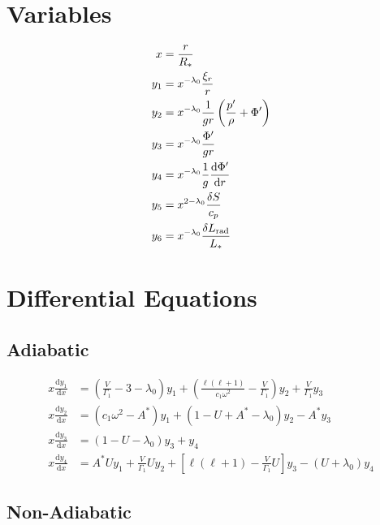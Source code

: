 \documentclass{article}
\newcommand{\diff}{\ensuremath{\mathrm{d}}}
\newcommand{\lz}{\ensuremath{\lambda_{0}}}
\newcommand{\Vg}{\ensuremath{\frac{V}{\Gamma_{1}}}}
\newcommand{\As}{\ensuremath{A^{\ast}}}
\newcommand{\Rstar}{\ensuremath{R_{\ast}}}
\newcommand{\Lrad}{\ensuremath{L_{\rm rad}}}
\newcommand{\Lstar}{\ensuremath{L_{\ast}}}
\begin{document}
\section*{Variables}

\begin{align*}
x     &= \frac{r}{\Rstar} \\
y_{1} &= x^{-\lz} \frac{\xi_{r}}{r} \\
y_{2} &= x^{-\lz} \frac{1}{gr} \left( \frac{p'}{\rho} + \Phi' \right)\\
y_{3} &= x^{-\lz} \frac{\Phi'}{gr}\\
y_{4} &= x^{-\lz} \frac{1}{g} \frac{\diff \Phi'}{\diff r}\\
y_{5} &= x^{2-\lz} \frac{\delta S}{c_{p}}\\
y_{6} &= x^{-\lz} \frac{\delta \Lrad}{\Lstar}
\end{align*}


\section*{Differential Equations}


\subsection*{Adiabatic}

\begin{align*}
x \frac{\diff y_{1}}{\diff x} &=
\left(\Vg - 3 - \lz \right) y_{1} +
\left(\frac{\ell(\ell+1)}{c_{1} \omega^{2}} - \Vg \right) y_{2} +
\Vg y_{3} \\
x \frac{\diff y_{2}}{\diff x} &=
(c_{1} \omega^{2} - \As ) y_{1} +
(1 - U + \As - \lz) y_{2} -
\As y_{3} \\
x \frac{\diff y_{3}}{\diff x} &=
(1 - U - \lz) y_{3} +
y_{4} \\
x \frac{\diff y_{4}}{\diff x} &=
\As U y_{1} +
\Vg U y_{2} +
\left[ \ell(\ell+1) - \Vg U \right] y_{3} -
(U + \lz) y_{4}
\end{align*}


\subsection*{Non-Adiabatic}
\end{document}
